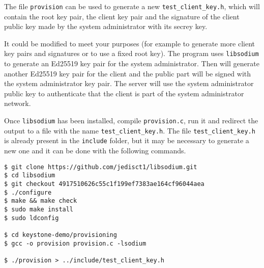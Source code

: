The file \texttt{provision} can be used to generate a new \texttt{test\_client\_key.h}, which will contain the root key pair, the client key pair and the signature of the client public key made by the system administrator with its secrey key. 

It could be modified to meet your purposes (for example to generate more client key pairs and signatures or to use a fixed root key).
The program uses \texttt{libsodium} to generate an Ed25519 key pair for the system administrator. Then will generate another Ed25519 key pair for the client and the public part will be signed with the system administrator key pair. The server will use the system administrator public key to authenticate that the client is part of the system administrator network.
 
Once \texttt{libsodium}  has been installed, compile \texttt{provision.c}, run it and redirect the output to a file with the name \texttt{test\_client\_key.h}. 
The file \texttt{test\_client\_key.h} is already present in the \texttt{include} folder, but it may be necessary to generate a new one and it can be done with the following commands. \\

\begin{lstlisting}[frame=single]
$ git clone https://github.com/jedisct1/libsodium.git
$ cd libsodium
$ git checkout 4917510626c55c1f199ef7383ae164cf96044aea
$ ./configure
$ make && make check
$ sudo make install
$ sudo ldconfig

$ cd keystone-demo/provisioning
$ gcc -o provision provision.c -lsodium

$ ./provision > ../include/test_client_key.h
\end{lstlisting}